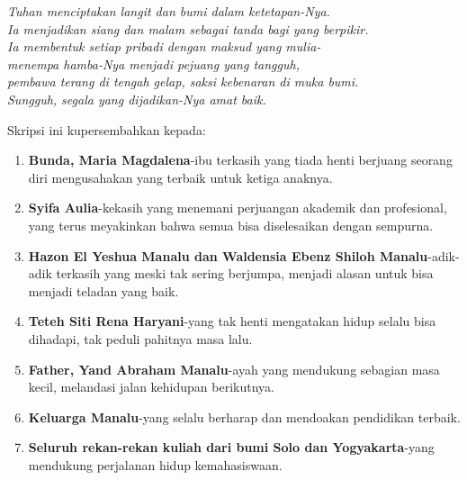\vspace{3cm}

\begin{center}
	{\itshape\large
	Tuhan menciptakan langit dan bumi dalam ketetapan-Nya.\\
	Ia menjadikan siang dan malam sebagai tanda bagi yang berpikir.\\
	Ia membentuk setiap pribadi dengan maksud yang mulia-\\
	menempa hamba-Nya menjadi pejuang yang tangguh,\\
	pembawa terang di tengah gelap, saksi kebenaran di muka bumi.\\
	Sungguh, segala yang dijadikan-Nya amat baik.}
	\vspace{2cm}
\end{center}

Skripsi ini kupersembahkan kepada:\vspace{0.5cm}

\begin{enumerate}[leftmargin=*]
	\item \textbf{Bunda, Maria Magdalena}-ibu terkasih yang tiada henti berjuang seorang diri mengusahakan yang terbaik untuk ketiga anaknya.
	
	\item \textbf{Syifa Aulia}-kekasih yang menemani perjuangan akademik dan profesional, yang terus meyakinkan bahwa semua bisa diselesaikan dengan sempurna.
	
	\item \textbf{Hazon El Yeshua Manalu dan Waldensia Ebenz Shiloh Manalu}-adik-adik terkasih yang meski tak sering berjumpa, menjadi alasan untuk bisa menjadi teladan yang baik.
	
	\item \textbf{Teteh Siti Rena Haryani}-yang tak henti mengatakan hidup selalu bisa dihadapi, tak peduli pahitnya masa lalu.
	
	\item \textbf{Father, Yand Abraham Manalu}-ayah yang mendukung sebagian masa kecil, melandasi jalan kehidupan berikutnya.
	
	\item \textbf{Keluarga Manalu}-yang selalu berharap dan mendoakan pendidikan terbaik.
	
	\item \textbf{Seluruh rekan-rekan kuliah dari bumi Solo dan Yogyakarta}-yang mendukung perjalanan hidup kemahasiswaan.
\end{enumerate}

